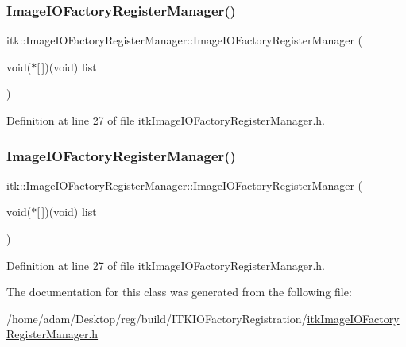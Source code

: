 \subsubsection{\texorpdfstring{Image\+I\+O\+Factory\+Register\+Manager()}{ImageIOFactoryRegisterManager()}\hspace{0.1cm}{\footnotesize\ttfamily [1/2]}}
{\footnotesize\ttfamily itk\+::\+Image\+I\+O\+Factory\+Register\+Manager\+::\+Image\+I\+O\+Factory\+Register\+Manager (\begin{DoxyParamCaption}\item[{void($\ast$\mbox{[}$\,$\mbox{]})(void)}]{list }\end{DoxyParamCaption})\hspace{0.3cm}{\ttfamily [inline]}}



Definition at line 27 of file itk\+Image\+I\+O\+Factory\+Register\+Manager.\+h.

\mbox{\label{classitk_1_1_image_i_o_factory_register_manager_aed949d5467196438d79b90abfcfb189b}} 
\subsubsection{\texorpdfstring{Image\+I\+O\+Factory\+Register\+Manager()}{ImageIOFactoryRegisterManager()}\hspace{0.1cm}{\footnotesize\ttfamily [2/2]}}
{\footnotesize\ttfamily itk\+::\+Image\+I\+O\+Factory\+Register\+Manager\+::\+Image\+I\+O\+Factory\+Register\+Manager (\begin{DoxyParamCaption}\item[{void($\ast$\mbox{[}$\,$\mbox{]})(void)}]{list }\end{DoxyParamCaption})\hspace{0.3cm}{\ttfamily [inline]}}



Definition at line 27 of file itk\+Image\+I\+O\+Factory\+Register\+Manager.\+h.



The documentation for this class was generated from the following file\+:\begin{DoxyCompactItemize}
\item 
/home/adam/\+Desktop/reg/build/\+I\+T\+K\+I\+O\+Factory\+Registration/\hyperlink{build_2_i_t_k_i_o_factory_registration_2itk_image_i_o_factory_register_manager_8h}{itk\+Image\+I\+O\+Factory\+Register\+Manager.\+h}\end{DoxyCompactItemize}
